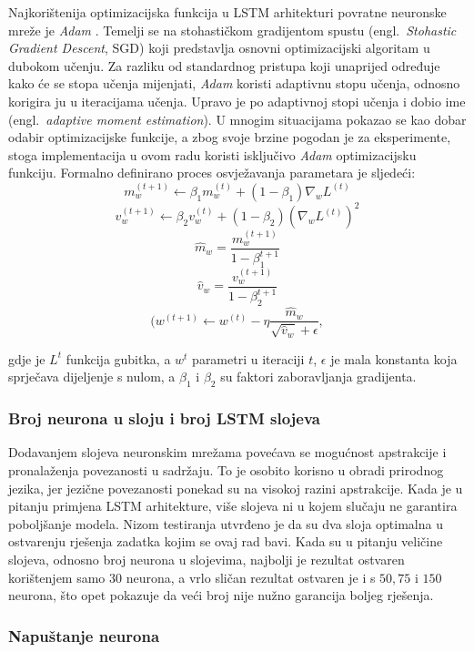\documentclass[times, utf8, zavrsni]{fer}
\begin{document}
Najkorištenija optimizacijska funkcija u \gls{LSTM} arhitekturi povratne neuronske mreže je \emph{Adam} \citep{kingma2014adam}. Temelji se na stohastičkom gradijentom spustu (engl.~\emph{Stohastic Gradient Descent}, SGD) koji predstavlja osnovni optimizacijski algoritam u dubokom učenju. Za razliku od standardnog pristupa koji unaprijed određuje kako će se stopa učenja mijenjati, \emph{Adam} koristi adaptivnu stopu učenja, odnosno korigira ju u iteracijama učenja. Upravo je po adaptivnoj stopi učenja i dobio ime (engl.~\emph{adaptive moment estimation}). U mnogim situacijama pokazao se kao dobar odabir optimizacijske funkcije, a zbog svoje brzine pogodan je za eksperimente, stoga implementacija u ovom radu koristi isključivo \emph{Adam} optimizacijsku funkciju. Formalno definirano proces osvježavanja parametara je sljedeći:
\[ m_{w}^{(t+1)} \leftarrow \beta_{1} m_{w}^{(t)}+\left(1-\beta_{1}\right) \nabla_{w} L^{(t)} \]
\[ v_{w}^{(t+1)} \leftarrow \beta_{2} v_{w}^{(t)}+\left(1-\beta_{2}\right)\left(\nabla_{w} L^{(t)}\right)^{2} \]
\[ \hat{m}_{w}=\frac{m_{w}^{(t+1)}}{1-\beta_{1}^{t+1}} \]
\[ \hat{v}_{w}=\frac{v_{w}^{(t+1)}}{1-\beta_{2}^{t+1}} \]
\[( w^{(t+1)} \leftarrow w^{(t)}-\eta \frac{\hat{m}_{w}}{\sqrt{\hat{v}_{w}}+\epsilon},  \]

\noindent gdje je $L^{t}$ funkcija gubitka, a $w^{t}$ parametri u iteraciji $t$, $\epsilon$ je mala konstanta koja sprječava dijeljenje s nulom, a $\beta _1$ i $\beta _2$ su faktori zaboravljanja gradijenta. 

\subsubsection{Broj neurona u sloju i broj \gls{LSTM} slojeva}

Dodavanjem slojeva neuronskim mrežama povećava se mogućnost apstrakcije i pronalaženja povezanosti u sadržaju. To je osobito korisno u obradi prirodnog jezika, jer jezične povezanosti ponekad su na visokoj razini apstrakcije. Kada je u pitanju primjena \gls{LSTM} arhitekture, više slojeva ni u kojem slučaju ne garantira poboljšanje modela. Nizom testiranja utvrđeno je da su dva sloja optimalna u ostvarenju rješenja zadatka kojim se ovaj rad bavi. 
Kada su u pitanju veličine slojeva, odnosno broj neurona u slojevima, najbolji je rezultat ostvaren korištenjem samo $30$ neurona, a vrlo sličan rezultat ostvaren je i s $50, 75$ i $150$ neurona, što opet pokazuje da veći broj nije nužno garancija boljeg rješenja. 

\subsubsection{Napuštanje neurona}
\end{document}
